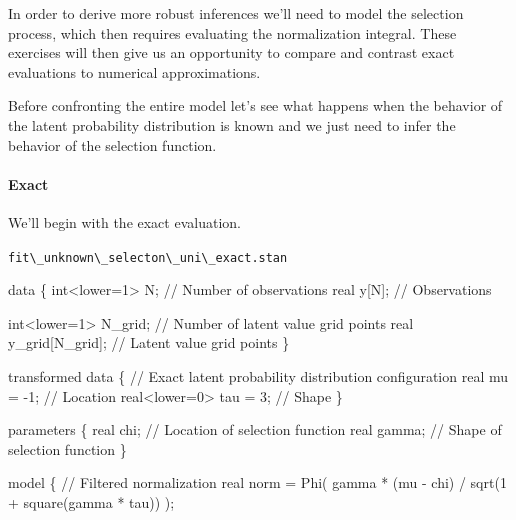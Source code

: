 \documentclass[
  letterpaper,
  DIV=11,
  numbers=noendperiod]{scrartcl}
\let\oldparagraph\paragraph
\renewcommand{\paragraph}[1]{\oldparagraph{#1}\mbox{}}
\newenvironment{Shaded}{\begin{snugshade}}{\end{snugshade}}
\newcommand{\CommentTok}[1]{\textcolor[rgb]{0.37,0.37,0.37}{#1}}
\newcommand{\DataTypeTok}[1]{\textcolor[rgb]{0.68,0.00,0.00}{#1}}
\newcommand{\DecValTok}[1]{\textcolor[rgb]{0.68,0.00,0.00}{#1}}
\newcommand{\KeywordTok}[1]{\textcolor[rgb]{0.00,0.23,0.31}{#1}}
\newcommand{\NormalTok}[1]{\textcolor[rgb]{0.00,0.23,0.31}{#1}}
\begin{document}
In order to derive more robust inferences we'll need to model the
selection process, which then requires evaluating the normalization
integral. These exercises will then give us an opportunity to compare
and contrast exact evaluations to numerical approximations.

Before confronting the entire model let's see what happens when the
behavior of the latent probability distribution is known and we just
need to infer the behavior of the selection function.

\paragraph{Exact}\label{exact}

We'll begin with the exact evaluation.

\begin{codelisting}

\caption{\texttt{fit\textbackslash\_unknown\textbackslash\_selecton\textbackslash\_uni\textbackslash\_exact.stan}}

\begin{Shaded}
\begin{Highlighting}[]
\KeywordTok{data}\NormalTok{ \{}
  \DataTypeTok{int}\NormalTok{\textless{}}\KeywordTok{lower}\NormalTok{=}\DecValTok{1}\NormalTok{\textgreater{} N; }\CommentTok{// Number of observations}
  \DataTypeTok{real}\NormalTok{ y[N];      }\CommentTok{// Observations}

  \DataTypeTok{int}\NormalTok{\textless{}}\KeywordTok{lower}\NormalTok{=}\DecValTok{1}\NormalTok{\textgreater{} N\_grid; }\CommentTok{// Number of latent value grid points}
  \DataTypeTok{real}\NormalTok{ y\_grid[N\_grid]; }\CommentTok{// Latent value grid points}
\NormalTok{\}}

\KeywordTok{transformed data}\NormalTok{ \{}
  \CommentTok{// Exact latent probability distribution configuration}
  \DataTypeTok{real}\NormalTok{ mu = {-}}\DecValTok{1}\NormalTok{;          }\CommentTok{// Location}
  \DataTypeTok{real}\NormalTok{\textless{}}\KeywordTok{lower}\NormalTok{=}\DecValTok{0}\NormalTok{\textgreater{} tau = }\DecValTok{3}\NormalTok{; }\CommentTok{// Shape}
\NormalTok{\}}

\KeywordTok{parameters}\NormalTok{ \{}
  \DataTypeTok{real}\NormalTok{ chi;   }\CommentTok{// Location of selection function}
  \DataTypeTok{real}\NormalTok{ gamma; }\CommentTok{// Shape of selection function}
\NormalTok{\}}

\KeywordTok{model}\NormalTok{ \{}
  \CommentTok{// Filtered normalization}
  \DataTypeTok{real}\NormalTok{ norm = Phi( gamma * (mu {-} chi) / sqrt(}\DecValTok{1}\NormalTok{ + square(gamma * tau)) );}
  

\end{Highlighting}
\end{Shaded}
\end{codelisting}
\end{document}
